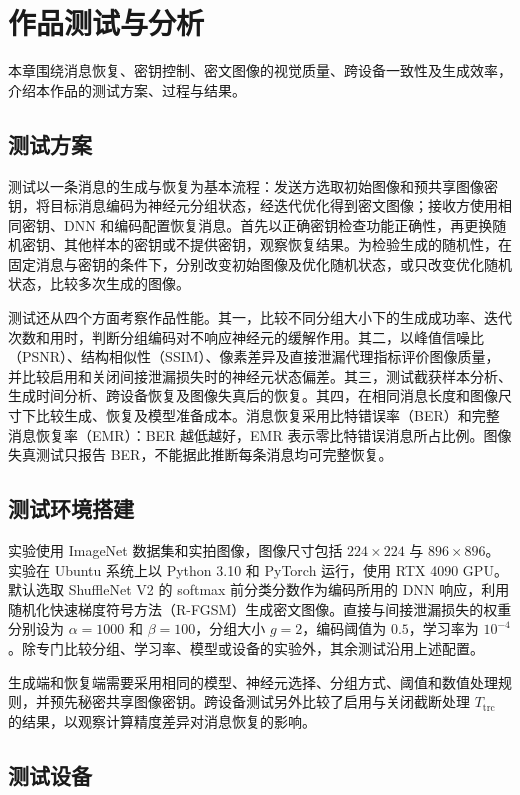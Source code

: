 \chapter{作品测试与分析}

本章围绕消息恢复、密钥控制、密文图像的视觉质量、跨设备一致性及生成效率，介绍本作品的测试方案、过程与结果。

\section{测试方案}

测试以一条消息的生成与恢复为基本流程：发送方选取初始图像和预共享图像密钥，将目标消息编码为神经元分组状态，经迭代优化得到密文图像；接收方使用相同密钥、DNN 和编码配置恢复消息。首先以正确密钥检查功能正确性，再更换随机密钥、其他样本的密钥或不提供密钥，观察恢复结果。为检验生成的随机性，在固定消息与密钥的条件下，分别改变初始图像及优化随机状态，或只改变优化随机状态，比较多次生成的图像。

测试还从四个方面考察作品性能。其一，比较不同分组大小下的生成成功率、迭代次数和用时，判断分组编码对不响应神经元的缓解作用。其二，以峰值信噪比（PSNR）、结构相似性（SSIM）、像素差异及直接泄漏代理指标评价图像质量，并比较启用和关闭间接泄漏损失时的神经元状态偏差。其三，测试截获样本分析、生成时间分析、跨设备恢复及图像失真后的恢复。其四，在相同消息长度和图像尺寸下比较生成、恢复及模型准备成本。消息恢复采用比特错误率（BER）和完整消息恢复率（EMR）：BER 越低越好，EMR 表示零比特错误消息所占比例。图像失真测试只报告 BER，不能据此推断每条消息均可完整恢复。

\section{测试环境搭建}

实验使用 ImageNet 数据集和实拍图像，图像尺寸包括 $224\times224$ 与 $896\times896$。实验在 Ubuntu 系统上以 Python 3.10 和 PyTorch 运行，使用 RTX 4090 GPU。默认选取 ShuffleNet V2 的 softmax 前分类分数作为编码所用的 DNN 响应，利用随机化快速梯度符号方法（R-FGSM）生成密文图像。直接与间接泄漏损失的权重分别设为 $\alpha=1000$ 和 $\beta=100$，分组大小 $g=2$，编码阈值为 $0.5$，学习率为 $10^{-4}$。除专门比较分组、学习率、模型或设备的实验外，其余测试沿用上述配置。

生成端和恢复端需要采用相同的模型、神经元选择、分组方式、阈值和数值处理规则，并预先秘密共享图像密钥。跨设备测试另外比较了启用与关闭截断处理 $T_{\mathrm{trc}}$ 的结果，以观察计算精度差异对消息恢复的影响。

\section{测试设备}


